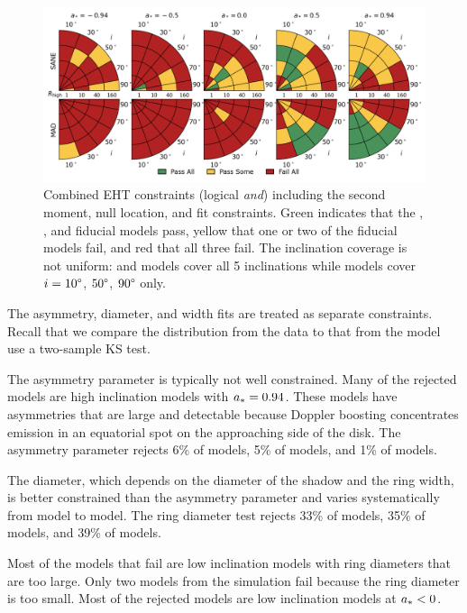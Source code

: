 \begin{figure}
  \centering
  \includegraphics[width=\textwidth]{./figures/Interferometric_Constraints.png}
  \caption{Combined EHT constraints (logical {\em and}) including the second moment, null location, and \mring fit constraints.
    Green indicates that the \kharma, \bhac, and \hamr fiducial models pass, yellow that one or two of the fiducial models fail, and red that all three fail.
    The inclination coverage is not uniform: \bhac and \kharma models cover all 5 inclinations while \hamr models cover $i = 10\degree$, $50\degree$, $90\degree$ only.}
  \label{fig:all_EHT_constraints} %
\end{figure}

The \mring asymmetry, diameter, and width fits are treated as separate constraints.
Recall that we compare the distribution from the data to that from the model use a two-sample KS test.

The asymmetry parameter is typically not well constrained.
Many of the rejected models are high inclination models with $a_* =0.94$.
These models have asymmetries that are large and detectable because Doppler boosting concentrates emission in an equatorial spot on the approaching side of the disk.
The asymmetry parameter rejects 6\% of \kharma models, 5\% of \bhac models, and 1\% of \hamr models.

The \mring diameter, which depends on the diameter of the shadow and the ring width, is better constrained than the asymmetry parameter and varies systematically from model to model.  %
The ring diameter test rejects 33\% of \kharma models, 35\% of \bhac models, and 39\% of \hamr models.

Most of the models that fail are low inclination models with ring diameters that are too large. Only two models from the \bhac simulation fail because the ring diameter is too small.  Most of the rejected models are low inclination models at $a_* < 0$.  

